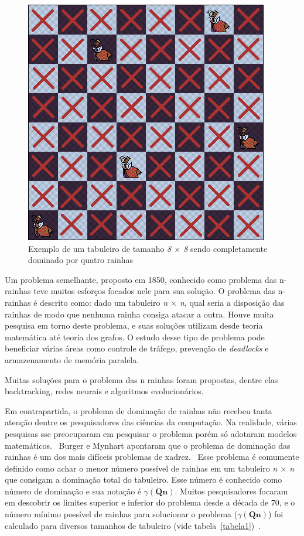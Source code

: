 \documentclass[
	article,			%
	11pt,				%
	oneside,			%
	a4paper,			%
	english,			%
	brazil,				%
	sumario=tradicional
	]{abntex2}
\begin{document}
\begin{figure}
  \centering
  \includegraphics[width=0.60\linewidth]{dom2rainha8x8.png}
  \caption{Exemplo de um tabuleiro de tamanho \textit{8 $\times$ 8} sendo completamente dominado por
  quatro rainhas}
  \label{fig:2rainha}
\end{figure}

Um problema semelhante, proposto em 1850, conhecido como problema das n-rainhas teve muitos esforços focados nele para sua solução. O problema das n-rainhas é descrito como: dado um tabuleiro \textit{n $\times$ n}, qual seria a disposição das rainhas de modo que nenhuma rainha consiga atacar a outra. Houve muita pesquisa em torno deste problema, e suas soluções utilizam desde teoria matemática até teoria dos grafos. O estudo desse tipo de problema pode beneficiar várias áreas como controle de tráfego, prevenção de \textit{deadlocks} e armazenamento de memória paralela.~\cite{bell2009survey}

Muitas soluções para o problema das n rainhas foram propostas, dentre elas backtracking, redes neurais e algoritmos evolucionários.

Em contrapartida, o problema de dominação de rainhas não recebeu tanta atenção dentre os pesquisadores das ciências da computação. Na realidade, várias pesquisas sse preocuparam em pesquisar o problema porém só adotaram modelos matemáticos.~\cite{alharbi2017genetic} Burger e Mynhart apontaram que o problema de dominação das rainhas é um dos mais difíceis problemas de xadrez.~\cite{art43}
Esse problema é comumente definido como achar o menor número possível de rainhas em um tabuleiro \textit{n $\times$ n} que consigam a dominação total do tabuleiro. Esse número é conhecido como número de dominação e sua notação é $\gamma(\textbf{Qn})$.
Muitos pesquisadores focaram em descobrir os limites superior e inferior do problema desde a década de 70,  e o número mínimo possível de rainhas para solucionar o problema ($\gamma(\textbf{Qn})$) foi calculado para diversos tamanhos de tabuleiro (vide tabela~\ref{tabela1})~\cite{art3,art43,art44,art45}.
\end{document}

